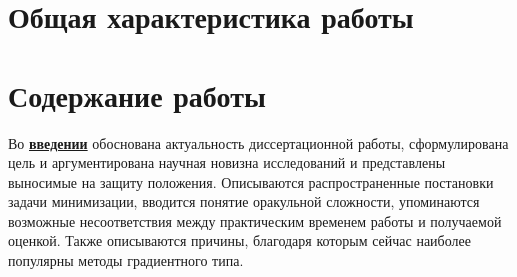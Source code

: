 \section*{Общая характеристика работы}

\newcommand{\actuality}{\pdfbookmark[1]{Актуальность}{actuality}\underline{\textbf{\actualityTXT}}}
\newcommand{\progress}{\pdfbookmark[1]{Разработанность темы}{progress}\underline{\textbf{\progressTXT}}}
\newcommand{\aim}{\pdfbookmark[1]{Цели}{aim}\underline{{\textbf\aimTXT}}}
\newcommand{\tasks}{\pdfbookmark[1]{Задачи}{tasks}\underline{\textbf{\tasksTXT}}}
\newcommand{\aimtasks}{\pdfbookmark[1]{Цели и задачи}{aimtasks}\aimtasksTXT}
\newcommand{\novelty}{\pdfbookmark[1]{Научная новизна}{novelty}\underline{\textbf{\noveltyTXT}}}
\newcommand{\influence}{\pdfbookmark[1]{Практическая значимость}{influence}\underline{\textbf{\influenceTXT}}}
\newcommand{\methods}{\pdfbookmark[1]{Методология и методы исследования}{methods}\underline{\textbf{\methodsTXT}}}
\newcommand{\defpositions}{\pdfbookmark[1]{Положения, выносимые на защиту}{defpositions}\underline{\textbf{\defpositionsTXT}}}
\newcommand{\reliability}{\pdfbookmark[1]{Достоверность}{reliability}\underline{\textbf{\reliabilityTXT}}}
\newcommand{\probation}{\pdfbookmark[1]{Апробация}{probation}\underline{\textbf{\probationTXT}}}
\newcommand{\contribution}{\pdfbookmark[1]{Личный вклад}{contribution}\underline{\textbf{\contributionTXT}}}
\newcommand{\publications}{\pdfbookmark[1]{Публикации}{publications}\underline{\textbf{\publicationsTXT}}}




\section*{Содержание работы}
Во \underline{\textbf{введении}} обоснована актуальность диссертационной работы, сформулирована цель и аргументирована научная новизна исследований и представлены выносимые на защиту положения. Описываются распространенные постановки задачи минимизации, вводится понятие оракульной сложности, упоминаются возможные несоответствия между практическим временем работы и получаемой оценкой. Также описываются причины, благодаря которым сейчас наиболее популярны методы градиентного типа. 

